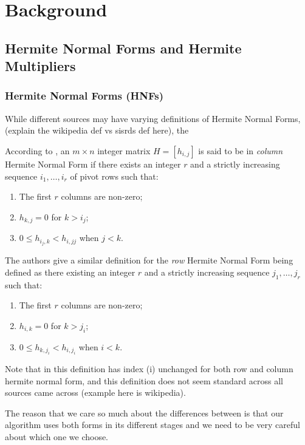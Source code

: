 \documentclass[oneside, a4paper, onecolumn, 11pt]{article}
\begin{document}
\section{Background}

\subsection{Hermite Normal Forms and Hermite Multipliers}

\subsubsection{Hermite Normal Forms (HNFs)}

While different sources may have varying definitions of Hermite Normal Forms, (explain the wikipedia def vs sisrds def here), the

According to \cite[SISRDS]{Hubert2013}, an \(m \times n\) integer matrix \(H = [h_{i, j}]\) is said to be in \textit{column} Hermite Normal Form if there exists an integer \(r\) and a strictly increasing sequence \(i_1, \dots, i_r\) of pivot rows such that:
\begin{enumerate}[label=(\roman*)]
    \item The first \(r\) columns are non-zero;
    \item \(h_{k, j} = 0\) for \(k > i_j\);
    \item \(0 \le h_{i_j, k} < h_{i,j j}\) when \(j < k\).
\end{enumerate}

The authors give a similar definition for the \textit{row} Hermite Normal Form being defined as there existing an integer \(r\) and a strictly increasing sequence \(j_1, \dots, j_r\) such that:
\begin{enumerate}[label=(\roman*)]
    \item The first \(r\) columns are non-zero;
    \item \(h_{i, k} = 0\) for \(k > j_i\);
    \item \(0 \le h_{k, j_i} < h_{i, j_i}\) when \(i < k\).
\end{enumerate}

Note that in this definition has index (i) unchanged for both row and column hermite normal form, and this definition does not seem standard across all sources came across (example here is wikipedia).

The reason that we care so much about the differences between is that our algorithm uses both forms in its different stages and we need to be very careful about which one we choose.
\end{document}
